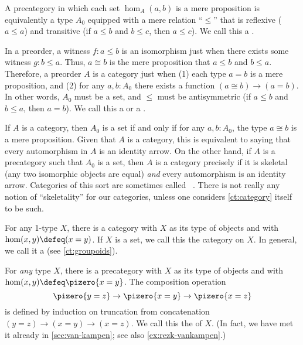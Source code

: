 \begin{eg}\label{ct:orders}
  A precategory in which each set $\hom_A(a,b)$ is a mere proposition is equivalently a type $A_0$ equipped with a mere relation ``$\le$'' that is reflexive ($a\le a$) and transitive (if $a\le b$ and $b\le c$, then $a\le c$).
  We call this a .

  In a preorder, a witness $f: a\le b$ is an isomorphism just when there exists some witness $g: b\le a$.
  Thus, $a\cong b$ is the mere proposition that $a\le b$ and $b\le a$.
  Therefore, a preorder $A$ is a category just when (1) each type $a=b$ is a mere proposition, and (2) for any $a,b:A_0$ there exists a function $(a\cong b) \to (a=b)$.
  In other words, $A_0$ must be a set, and $\le$ must be antisymmetric (if $a\le b$ and $b\le a$, then $a=b$).
  We call this a  or a .
\end{eg}

\begin{eg}\label{ct:gaunt}
  If $A$ is a category, then $A_0$ is a set if and only if for any $a,b:A_0$, the type $a\cong b$ is a mere proposition.
  Given that $A$ is a category, this is equivalent to saying that every automorphism in $A$ is an identity arrow. On the other hand, if $A$ is a precategory such that $A_0$ is a set, then $A$ is a category precisely if it is skeletal (any two isomorphic objects are equal) \emph{and} every automorphism is an identity arrow.
  Categories of this sort are sometimes called ~\cite{bsp12infncats}.
  There is not really any notion of ``skeletality'' for our categories, unless one considers \cref{ct:category} itself to be such.
\end{eg}

\begin{eg}\label{ct:discrete}
  For any 1-type $X$, there is a category with $X$ as its type of objects and with $\hom(x,y) \defeq (x=y)$.
  If $X$ is a set, we call this the 
  category on $X$.
  In general, we call it a 
  (see \cref{ct:groupoids}).
\end{eg}

\begin{eg}\label{ct:fundgpd}
  For \emph{any} type $X$, there is a precategory with $X$ as its type of objects and with $\hom(x,y) \defeq \pizero{x=y}$.
  The composition operation
  \[ \pizero{y=z} \to \pizero{x=y} \to \pizero{x=z} \]
  is defined by induction on truncation from concatenation $(y=z)\to(x=y)\to(x=z)$.
  We call this the 
  of $X$.
  (In fact, we have met it already in \cref{sec:van-kampen}; see also \cref{ex:rezk-vankampen}.)
\end{eg}

